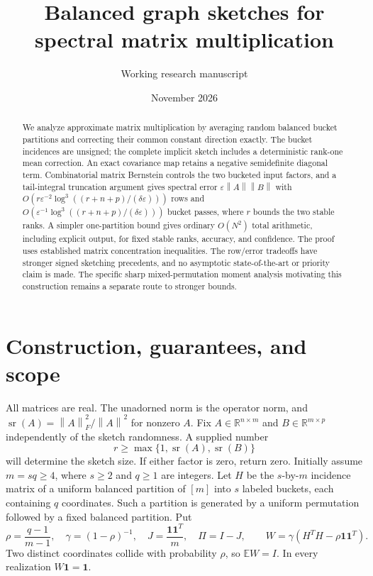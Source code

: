 \documentclass[11pt]{article}
\title{Balanced graph sketches for spectral matrix multiplication}
\author{Working research manuscript}
\date{November 2026}
\newcommand{\R}{\mathbb R}
\newcommand{\E}{\mathbb E}
\newcommand{\norm}[1]{\left\lVert#1\right\rVert}
\newcommand{\sr}{\operatorname{sr}}
\begin{document}
\maketitle
\begin{abstract}
We analyze approximate matrix multiplication by averaging random balanced
bucket partitions and correcting their common constant direction exactly.
The bucket incidences are unsigned; the complete implicit sketch includes
a deterministic rank-one mean correction. An exact covariance map retains
a negative semidefinite diagonal term. Combinatorial matrix Bernstein
controls the two bucketed input factors, and a tail-integral truncation
argument gives spectral error $\varepsilon\norm A\norm B$ with
$O(r\varepsilon^{-2}\log^3((r+n+p)/(\delta\varepsilon)))$ rows and
$O(\varepsilon^{-1}\log^3((r+n+p)/(\delta\varepsilon)))$ bucket passes,
where $r$ bounds the two stable ranks. A simpler one-partition bound gives
ordinary $O(N^2)$ total arithmetic, including explicit output, for fixed
stable ranks, accuracy, and confidence. The proof uses established matrix
concentration inequalities. The row/error tradeoffs have stronger signed
sketching precedents, and no asymptotic state-of-the-art or priority claim
is made. The specific sharp mixed-permutation moment analysis motivating
this construction remains a separate route to stronger bounds.
\end{abstract}

\section{Construction, guarantees, and scope}
All matrices are real. The unadorned norm is the operator norm, and
$\sr(A)=\norm A_F^2/\norm A^2$ for nonzero $A$.
Fix $A\in\R^{n\times m}$ and $B\in\R^{m\times p}$ independently of
the sketch randomness. A supplied number
\[
 r\ge\max\{1,\sr(A),\sr(B)\}
\]
will determine the sketch size. If either factor is zero, return zero.
Initially assume $m=sq\ge4$, where $s\ge2$ and $q\ge1$ are integers.
Let $H$ be the $s$-by-$m$ incidence matrix of a uniform balanced partition
of $[m]$ into $s$ labeled buckets, each containing $q$ coordinates.
Such a partition is generated by a uniform permutation followed by a
fixed balanced partition. Put
\begin{equation}\label{eq:W}
 \rho=\frac{q-1}{m-1},\quad \gamma=(1-\rho)^{-1},\quad
 J=\frac{\mathbf1\mathbf1^T}{m},\quad \Pi=I-J,\qquad
 W=\gamma(H^TH-\rho\mathbf1\mathbf1^T).
\end{equation}
Two distinct coordinates collide with probability $\rho$, so
$\E W=I$. In every realization $W\mathbf1=\mathbf1$.
\end{document}

